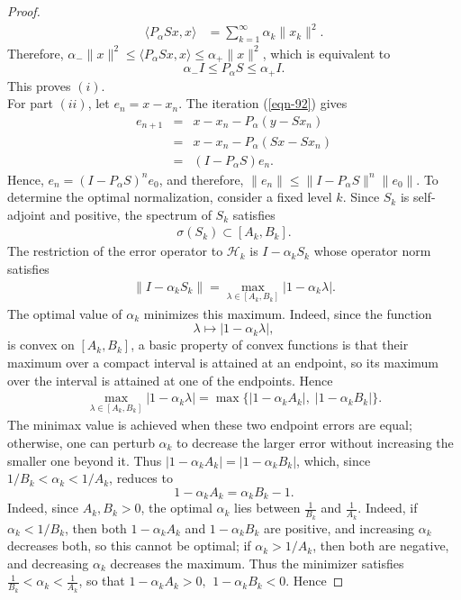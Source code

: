 \documentclass[10pt,a4paper]{amsart}
\begin{document}
\begin{proof}
\begin{eqnarray*}
\langle P_\alpha Sx,x\rangle &= \sum_{k=1}^{\infty}
\alpha_k\|x_k\|^2.
\end{eqnarray*}
Therefore, $\alpha_-\|x\|^2 \le \langle P_\alpha Sx,x\rangle \le
\alpha_+\|x\|^2$, which is equivalent to $$\alpha_-I \le P_\alpha
S \le \alpha_+I.$$ This proves $(i)$.\\
For part $(ii)$, let $e_n=x-x_n $. The iteration (\ref{eqn-92})
gives
\begin{eqnarray*}
e_{n+1} &=& x-x_n-P_\alpha(y-Sx_n)\\ &=& x-x_n-P_\alpha(Sx-Sx_n)\\
&=& (I-P_\alpha S)e_n .
\end{eqnarray*}
Hence, $e_n=(I-P_\alpha S)^ne_0$, and therefore, $\|e_n\| \leq
\|I-P_\alpha S\|^n \|e_0\|$. To determine the optimal
normalization, consider a fixed level $k$. Since $S_k$ is
self-adjoint and positive, the spectrum of $S_k$ satisfies
\begin{eqnarray*}
\sigma(S_k) \subset[A_k,B_k].
\end{eqnarray*}
The restriction of the error operator to $\mathcal H_k$ is
$I-\alpha_kS_k$ whose operator norm satisfies
\begin{eqnarray*}
\|I-\alpha_kS_k\| = \max_{\lambda\in[A_k,B_k]}
|1-\alpha_k\lambda|.
\end{eqnarray*}
The optimal value of $\alpha_k$ minimizes this maximum. Indeed,
since the function $$\lambda \longmapsto |1-\alpha_k\lambda|,$$ is
convex on $[A_k,B_k]$, a basic property of convex functions is
that their maximum over a compact interval is attained at an
endpoint, so its maximum over the interval is attained at one of
the endpoints. Hence
\begin{eqnarray*}
\max_{\lambda\in[A_k,B_k]}|1-\alpha_k\lambda| =
\max\{|1-\alpha_kA_k|,\;|1-\alpha_kB_k|\}.
\end{eqnarray*}
The minimax value is achieved when these two endpoint errors are
equal; otherwise, one can perturb $\alpha_k$ to decrease the
larger error without increasing the smaller one beyond it. Thus
$|1-\alpha_kA_k| = |1-\alpha_kB_k|$, which, since
$1/B_k<\alpha_k<1/A_k$, reduces to $$1-\alpha_kA_k =
\alpha_kB_k-1.$$ Indeed, since $A_k,B_k>0$, the optimal $\alpha_k$
lies between $\frac{1}{B_k}$ and $\frac{1}{A_k}$. Indeed, if
$\alpha_k<1/B_k$, then both $1-\alpha_k A_k$ and $1-\alpha_k B_k$
are positive, and increasing $\alpha_k$ decreases both, so this
cannot be optimal; if $\alpha_k>1/A_k$, then both are negative,
and decreasing $\alpha_k$ decreases the maximum. Thus the
minimizer satisfies $\frac1{B_k} < \alpha_k < \frac1{A_k}$, so
that $1-\alpha_k A_k>0, \,\ 1-\alpha_k B_k<0$. Hence


\end{proof}
\end{document}
